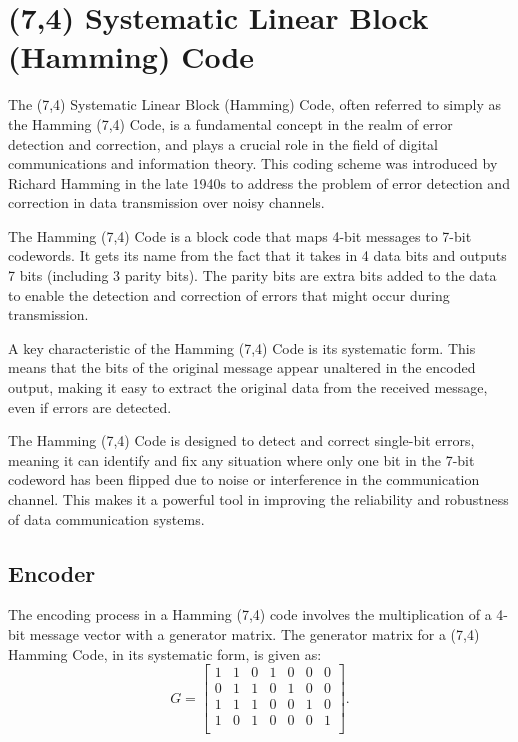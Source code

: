 \documentclass{article}
\begin{document}
\section{(7,4) Systematic Linear Block (Hamming) Code}
The (7,4) Systematic Linear Block (Hamming) Code, often referred to simply as the Hamming (7,4) Code, is a fundamental concept in the realm of error detection and correction, and plays a crucial role in the field of digital communications and information theory. This coding scheme was introduced by Richard Hamming in the late 1940s to address the problem of error detection and correction in data transmission over noisy channels.

The Hamming (7,4) Code is a block code that maps 4-bit messages to 7-bit codewords. It gets its name from the fact that it takes in 4 data bits and outputs 7 bits (including 3 parity bits). The parity bits are extra bits added to the data to enable the detection and correction of errors that might occur during transmission.

A key characteristic of the Hamming (7,4) Code is its systematic form. This means that the bits of the original message appear unaltered in the encoded output, making it easy to extract the original data from the received message, even if errors are detected. 

The Hamming (7,4) Code is designed to detect and correct single-bit errors, meaning it can identify and fix any situation where only one bit in the 7-bit codeword has been flipped due to noise or interference in the communication channel. This makes it a powerful tool in improving the reliability and robustness of data communication systems.



\subsection{Encoder}
The encoding process in a Hamming (7,4) code involves the multiplication of a 4-bit message vector with a generator matrix. The generator matrix for a (7,4) Hamming Code, in its systematic form, is given as:
\begin{equation*}
    G = 
        \begin{bmatrix}
        1 & 1 & 0 & 1 & 0 & 0 & 0 \\
        0 & 1 & 1 & 0 & 1 & 0 & 0 \\
        1 & 1 & 1 & 0 & 0 & 1 & 0 \\
        1 & 0 & 1 & 0 & 0 & 0 & 1 \\
        \end{bmatrix}.
\end{equation*}
\end{document}
